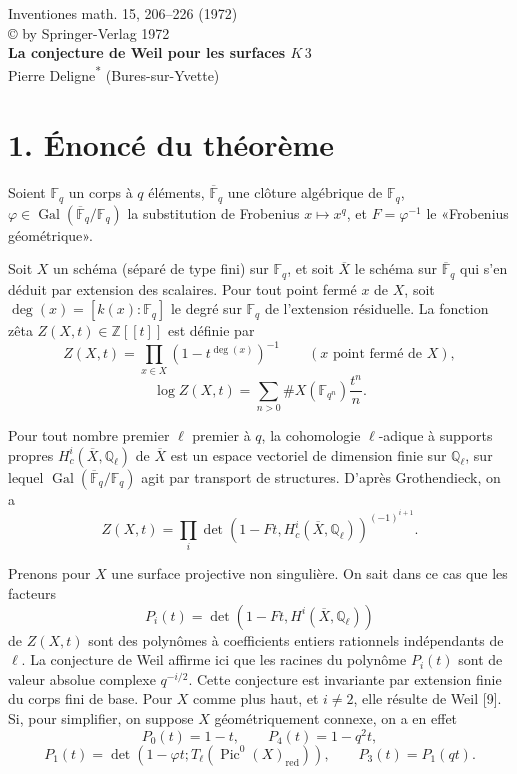 \documentclass[10pt,leqno]{article}
\newcommand{\F}{\mathbb{F}}
\newcommand{\Z}{\mathbb{Z}}
\newcommand{\Ql}{\mathbb{Q}_\ell}
\newcommand{\Fp}{\mathbb{F}_q}
\newcommand{\Gal}{\operatorname{Gal}}
\newcommand{\Pic}{\operatorname{Pic}}
\begin{document}
\begin{center}
{\large Inventiones math. 15, 206--226 (1972)}\\
{\small \copyright{} by Springer-Verlag 1972}\\[3.0em]
{\Large\bfseries La conjecture de Weil pour les surfaces \(K\,3\)}\\[1.5em]
{Pierre Deligne\textsuperscript{*} (Bures-sur-Yvette)}
\end{center}

\section*{1. Énoncé du théorème}

Soient $\Fp$ un corps à $q$ éléments, $\overline{\F}_q$ une clôture algébrique de $\Fp$, $\varphi\in\Gal(\overline{\F}_q/\Fp)$ la substitution de Frobenius $x\mapsto x^q$, et $F=\varphi^{-1}$ le «Frobenius géométrique».

Soit $X$ un schéma (séparé de type fini) sur $\Fp$, et soit $\overline X$ le schéma sur $\overline{\F}_q$ qui s'en déduit par extension des scalaires. Pour tout point fermé $x$ de $X$, soit $\deg(x)=[k(x):\Fp]$ le degré sur $\Fp$ de l'extension résiduelle. La fonction zêta $Z(X,t)\in\Z[[t]]$ est définie par
\[
Z(X,t)=\prod_{x\in X}(1-t^{\deg(x)})^{-1}\qquad(x\text{ point fermé de }X),
\]
\[
\log Z(X,t)=\sum_{n>0}\#X(\F_{q^n})\frac{t^n}{n}.
\]

Pour tout nombre premier $\ell$ premier à $q$, la cohomologie $\ell$-adique à supports propres $H_c^i(\overline X,\Ql)$ de $\overline X$ est un espace vectoriel de dimension finie sur $\Ql$, sur lequel $\Gal(\overline{\F}_q/\Fp)$ agit par transport de structures. D'après Grothendieck, on a
\[
Z(X,t)=\prod_i\det(1-Ft,H_c^i(\overline X,\Ql))^{(-1)^{i+1}}.
\]

Prenons pour $X$ une surface projective non singulière. On sait dans ce cas que les facteurs
\[
P_i(t)=\det(1-Ft,H^i(\overline X,\Ql))
\]
de $Z(X,t)$ sont des polynômes à coefficients entiers rationnels indépendants de $\ell$. La conjecture de Weil affirme ici que les racines du polynôme $P_i(t)$ sont de valeur absolue complexe $q^{-i/2}$. Cette conjecture est invariante par extension finie du corps fini de base. Pour $X$ comme plus haut, et $i\ne2$, elle résulte de Weil [9]. Si, pour simplifier, on suppose $X$ géométriquement connexe, on a en effet
\[
P_0(t)=1-t,
\qquad
P_4(t)=1-q^2t,
\]
\[
P_1(t)=\det(1-\varphi t;T_\ell(\Pic^0(X)_{\mathrm{red}})),
\qquad
P_3(t)=P_1(qt).
\]
\end{document}
